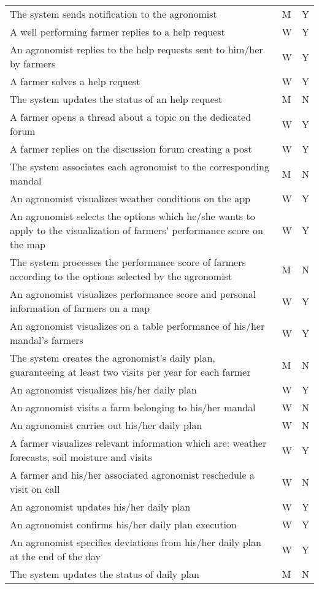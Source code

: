 \begin{center}
\begin{longtable}{ |m{7cm}|C{2.3cm}|C{1.6cm}|}
The system sends notification to the agronomist & M & Y\\
A well performing farmer replies to a help request & W & Y\\
An agronomist replies to the help requests sent to him/her by farmers & W & Y\\
A farmer solves a help request & W & Y\\
The system updates the status of an help request & M & N\\
A farmer opens a thread about a topic on the dedicated forum & W & Y\\
A farmer replies on the discussion forum creating a post & W & Y\\
The system associates each agronomist to the corresponding mandal & M & N\\
An agronomist visualizes weather conditions on the app & W & Y\\
An agronomist selects the options which he/she wants to apply to the visualization of farmers' performance score on the map & W & Y\\
The system processes the performance score of farmers according to the options selected by the agronomist & M & N\\
An agronomist visualizes performance score and personal information of farmers on a map & W & Y\\
An agronomist visualizes on a table performance of his/her mandal's farmers & W & Y\\
The system creates the agronomist's daily plan, guaranteeing at least two visits per year for each farmer & M & N\\
An agronomist visualizes his/her daily plan & W & Y\\
An agronomist visits a farm belonging to his/her mandal & W & N\\
An agronomist carries out his/her daily plan & W & N\\
A farmer visualizes relevant information which are: weather forecasts, soil moisture and visits & W & Y\\
A farmer and his/her associated agronomist reschedule a visit on call & W & N\\
An agronomist updates his/her daily plan & W & Y\\
An agronomist confirms his/her daily plan execution & W & Y\\
An agronomist specifies deviations from his/her daily plan at the end of the day & W & Y\\
The system updates the status of daily plan & M & N\\

\end{longtable}

\end{center}